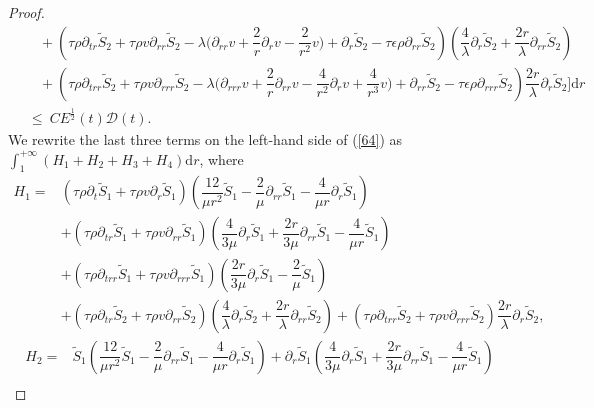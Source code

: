 \documentclass[10pt,reqno]{amsart}
\numberwithin{equation}{section}
\begin{document}
\begin{proof}
\begin{align}
				&\quad
				+\left(\tau \rho\partial_{tr}\tilde{S}_2+\tau  \rho v \partial_{rr}\tilde{S}_2
				-\lambda \big(\partial_{rr} v+\dfrac{2}{r}\partial_r v-\dfrac{2}{r^2} v\big)+\partial_r \tilde{S}_2 -\tau\epsilon\rho\partial_{rr}\tilde{S}_2\right)
				(\dfrac{4}{\lambda}\partial_{r}\tilde{S}_2+\dfrac{2r}{\lambda}\partial_{rr}\tilde{S}_2) \nonumber \\
				&\quad
				+\left(\tau \rho\partial_{trr}\tilde{S}_2+\tau  \rho v \partial_{rrr}\tilde{S}_2
				-\lambda \big(\partial_{rrr} v+\dfrac{2}{r}\partial_{rr} v-\dfrac{4}{r^2} \partial_{r}v+\dfrac{4}{r^3}v\big)+\partial_{rr} \tilde{S}_2-\tau\epsilon\rho\partial_{rrr}\tilde{S}_2
				\right)\dfrac{2r}{\lambda}\partial_{r}\tilde{S}_2\bigg]\mathrm{d}r \nonumber \\
				&
				~\leq ~C E^{\frac{1}{2}}(t) \mathcal{D}(t).
			\end{align}
		We rewrite the last three terms on the left-hand side of (\ref{64}) as $\int_{1}^{+\infty}(H_1+H_2+H_3+H_4)\mathrm{d}r$, where
		\begin{equation}\nonumber
			\begin{aligned}
				H_1=&	
				\left(\tau \rho\partial_{t}\tilde{S}_1+\tau \rho v\partial_r\tilde{S}_1  \right)(\dfrac{12}{\mu r^2}\tilde{S}_1-\dfrac{2}{\mu}\partial_{rr}\tilde{S}_1-\dfrac{4}{\mu r}\partial_{r}\tilde{S}_1)\\
				&
				+\left(\tau \rho\partial_{tr}\tilde{S}_1+\tau \rho v \partial_{rr}\tilde{S}_1 
				\right)(\dfrac{4}{3\mu}\partial_{r}\tilde{S}_1+\dfrac{2r}{3\mu}\partial_{rr}\tilde{S}_1 -\dfrac{4}{\mu r}\tilde{S}_1)\\
				&+\left(\tau \rho\partial_{trr}\tilde{S}_1+\tau \rho v \partial_{rrr}\tilde{S}_1 
				\right)(\dfrac{2r}{3\mu}\partial_{r}\tilde{S}_1 -\dfrac{2}{\mu}\tilde{S}_1)\\
				&
				+\left(\tau \rho\partial_{tr}\tilde{S}_2+\tau  \rho v \partial_{rr}\tilde{S}_2
				\right)
				(\dfrac{4}{\lambda}\partial_{r}\tilde{S}_2+\dfrac{2r}{\lambda}\partial_{rr}\tilde{S}_2)
				+\left(\tau \rho\partial_{trr}\tilde{S}_2+\tau  \rho v \partial_{rrr}\tilde{S}_2
				\right)\dfrac{2r}{\lambda}\partial_{r}\tilde{S}_2,
			\end{aligned}
		\end{equation}
		\begin{equation}\nonumber
			\begin{aligned}
				H_2
				=&\tilde{S}_1(\dfrac{12}{\mu r^2}\tilde{S}_1-\dfrac{2}{\mu}\partial_{rr}\tilde{S}_1-\dfrac{4}{\mu r}\partial_{r}\tilde{S}_1)
				+\partial_{r}\tilde{S}_1(\dfrac{4}{3\mu}\partial_{r}\tilde{S}_1+\dfrac{2r}{3\mu}\partial_{rr}\tilde{S}_1 -\dfrac{4}{\mu r}\tilde{S}_1)\\

\end{aligned}
\end{equation}
\end{proof}
\end{document}
